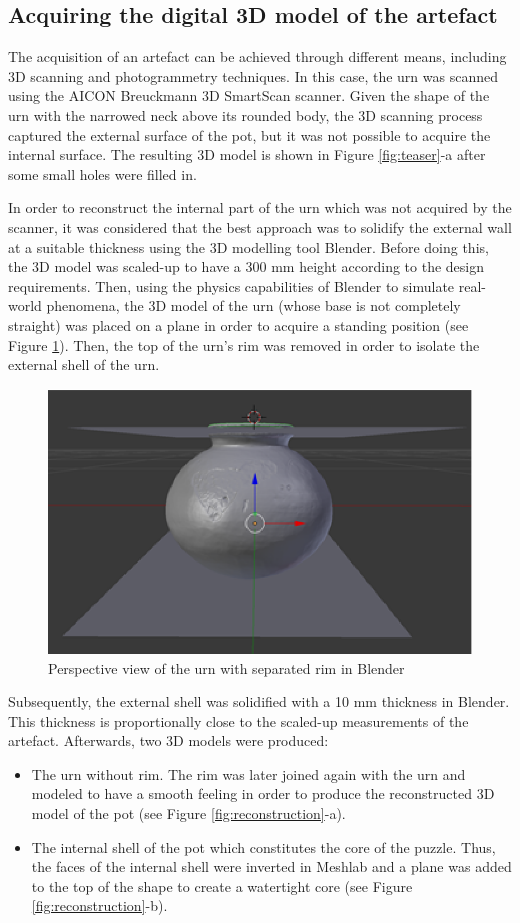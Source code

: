 \documentclass[acmlarge,screen]{acmart}
\begin{document}
\subsection{Acquiring the digital 3D model of the artefact}
The acquisition of an artefact can be achieved through different means, including 3D scanning and photogrammetry techniques. In this case, the urn was scanned using the AICON Breuckmann 3D SmartScan scanner. Given the shape of the urn with the narrowed neck above its rounded body, the 3D scanning process captured the external surface of the pot, but it was not possible to acquire the internal surface. The resulting 3D model is shown in Figure \ref{fig:teaser}-a after some small holes were filled in.

In order to reconstruct the internal part of the urn which was not acquired by the scanner, it was considered that the best approach was to solidify the external wall at a suitable thickness using the 3D modelling tool Blender. Before doing this, the 3D model was scaled-up to have a 300 mm height according to the design requirements. Then, using the physics capabilities of Blender to simulate real-world phenomena, the 3D model of the urn (whose base is not completely straight) was placed on a plane in order to acquire a standing position (see Figure \ref{fig:blender}). Then, the top of the urn's rim was removed in order to isolate the external shell of the urn.

\begin{figure}[h]
  \centering
  \includegraphics[width=0.6\linewidth]{images/blender2}
  \caption{\label{fig:blender}
    Perspective view of the urn with separated rim in Blender}
\end{figure}

Subsequently, the external shell was solidified with a 10 mm thickness in Blender. This thickness is proportionally close to the scaled-up measurements of the artefact. Afterwards, two 3D models were produced:
\begin{itemize}
\item The urn without rim. The rim was later joined again with the urn and modeled to have a smooth feeling in order to produce the reconstructed 3D model of the pot (see Figure \ref{fig:reconstruction}-a).
\item The internal shell of the pot which constitutes the core of the puzzle. Thus, the faces of the internal shell were inverted in Meshlab and a plane was added to the top of the shape to create a watertight core (see Figure \ref{fig:reconstruction}-b).
\end{itemize}
\end{document}
